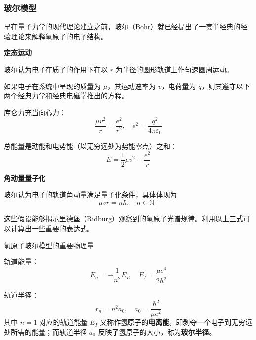 \documentclass[cn,10pt,math=newtx,citestyle=gb7714-2015,bibstyle=gb7714-2015]{elegantbook}
\def\N{\mathbb N}
\def\ve{\varepsilon}
\begin{document}
\subsubsection{玻尔模型}

早在量子力学的现代理论建立之前，玻尔（Bohr）就已经提出了一套半经典的经验理论来解释氢原子的电子结构。

\begin{assumption}\textbf{定态运动}

玻尔认为电子在质子的作用下在以 $r$ 为半径的圆形轨道上作匀速圆周运动。

如果电子在系统中呈现的质量为 $\mu$，其运动速率为 $v$，电荷量为 $q$，则其遵守以下两个经典力学和经典电磁学推出的方程。

库仑力充当向心力：
\begin{equation}
    \frac{\mu v^2} r=\frac{e^2}{r^2},\quad e^2=\frac{q^2}{4\pi\ve_0}
\end{equation}

总能量是动能和电势能（以无穷远处为势能零点）之和：
\begin{equation}
    E=\frac 1 2{\mu v^2}-\frac{e^2} r
\end{equation}
\end{assumption}

\begin{assumption}\textbf{角动量量子化}

   玻尔认为电子的轨道角动量满足量子化条件，具体体现为
    \begin{equation}
        \mu vr=n\hbar,\quad n\in\N_+
    \end{equation}
\end{assumption}

这些假设能够揭示里德堡（Ridburg）观察到的氢原子光谱规律。利用以上三式可以计算出一些重要的表达式。
\begin{conclusion}氢原子玻尔模型的重要物理量

轨道能量：
\begin{equation}
    E_n=-\frac 1{n^2}E_I,\quad E_I=\frac{\mu e^4}{2\hbar^2}
\end{equation}

轨道半径：
\begin{equation}
    r_n = n^2 a_0,\quad a_0=\frac{\hbar^2}{\mu e^2}
\end{equation}
其中 $n=1$ 对应的轨道能量 $E_I$ 又称作氢原子的\textbf{电离能}，即剥夺一个电子到无穷远处所需的能量；而轨道半径 $a_0$ 反映了氢原子的大小，称为\textbf{玻尔半径}。
\end{conclusion}
\end{document}
